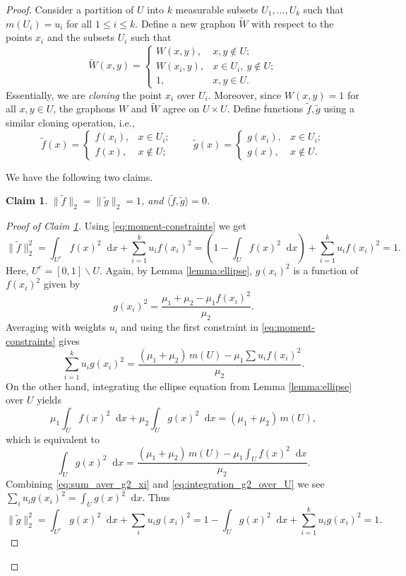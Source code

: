 \documentclass[10pt,a4paper]{amsart}
\newtheorem{claim}{Claim}
\newcommand{\dif}{\mathop{}\!\mathrm{d}}
\begin{document}
\begin{proof} 
Consider a partition of $U$ into $k$ measurable subsets $U_1, \ldots, U_k$ 
such that $m(U_i) = u_i$ for all $1\le i\le k$. Define a new graphon $\widetilde{W}$ with 
respect to the points $x_i$ and the subsets $U_i$ such that
\[
\widetilde{W}(x,y)=
\begin{cases}
W(x,y), & x,y\notin U;\\
W(x_i,y), & x\in U_i,\ y\notin U; \\
1, & x,y\in U.
\end{cases}
\]
Essentially, we are \emph{cloning} the point $x_i$ over $U_i$. Moreover, since $W(x,y)=1$ 
for all $x,y\in U$, the graphons $W$ and $\widetilde{W}$ agree on $U\times U$. 
Define functions $\tilde{f},\tilde{g}$ using a similar cloning operation, i.e.,  
\begin{equation}\label{eq:tilde-def}
\tilde f(x)=
\begin{cases}
f(x_i), & x\in U_i;\\
f(x), & x\notin U;
\end{cases}
\qquad
\tilde g(x)=
\begin{cases}
g(x_i), & x\in U_i;\\
g(x), & x\notin U.
\end{cases}
\end{equation}

We have the following two claims.

\begin{claim}\label{claim:norm_tilde_f_g}
$\|\tilde{f}\|_2 = \|\tilde{g}\|_2 = 1$, and $\langle \tilde f,\tilde g\rangle = 0$. 
\end{claim}

\begin{proof}[Proof of Claim \ref{claim:norm_tilde_f_g}]
Using \eqref{eq:moment-constraints} we get 
\[
\|\tilde f\|_2^2
= \int_{U^c} f(x)^2 \dif{x} + \sum_{i=1}^k u_i f(x_i)^2
= \left(1-\int_U f(x)^2 \dif{x}\right) + \sum_{i=1}^k u_i f(x_i)^2 = 1.
\]
Here, $U^c = [0,1]\backslash U$. Again, by Lemma \ref{lemma:ellipse}, $g(x_i)^2$ 
is a function of $f(x_i)^2$ given by
\[
g(x_i)^2=\frac{\mu_1+\mu_2-\mu_1 f(x_i)^2}{\mu_2}.
\]
Averaging with weights $u_i$ and using the first constraint in \eqref{eq:moment-constraints} gives
\begin{equation}\label{eq:sum_aver_g2_xi}
\sum_{i=1}^k u_i g(x_i)^2
=\frac{(\mu_1+\mu_2)\, m(U) - \mu_1 \sum u_i f(x_i)^2}{\mu_2}.
\end{equation}
On the other hand, integrating the ellipse equation from Lemma \ref{lemma:ellipse} over $U$ yields
\[
\mu_1 \int_U f(x)^2 \dif{x} + \mu_2\int_U g(x)^2 \dif{x} = (\mu_1+\mu_2)\, m(U),
\] 
which is equivalent to
\begin{equation}\label{eq:integration_g2_over_U}
\int_U g(x)^2 \dif{x} = \frac{(\mu_1+\mu_2)\, m(U) - \mu_1\int_U f(x)^2 \dif{x}}{\mu_2}.
\end{equation}
Combining \eqref{eq:sum_aver_g2_xi} and \eqref{eq:integration_g2_over_U} we see 
$\sum_i u_i g(x_i)^2=\int_U g(x)^2 \dif{x}$. Thus
\[
\|\tilde g\|_2^2
= \int_{U^c} g(x)^2 \dif{x} + \sum_i u_i g(x_i)^2
= 1-\int_U g(x)^2 \dif{x} + \sum_{i=1}^k u_i g(x_i)^2
= 1.
\]


\end{proof}
\end{proof}
\end{document}
